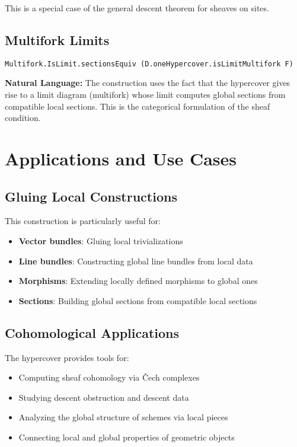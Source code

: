 \documentclass{article}
\theoremstyle{definition}
\begin{document}
This is a special case of the general descent theorem for sheaves on sites.

\subsection{Multifork Limits}

\begin{lstlisting}
Multifork.IsLimit.sectionsEquiv (D.oneHypercover.isLimitMultifork F)
\end{lstlisting}

\textbf{Natural Language:} The construction uses the fact that the hypercover gives rise to a limit diagram (multifork) whose limit computes global sections from compatible local sections. This is the categorical formulation of the sheaf condition.

\section{Applications and Use Cases}

\subsection{Gluing Local Constructions}

This construction is particularly useful for:
\begin{itemize}
\item \textbf{Vector bundles}: Gluing local trivializations
\item \textbf{Line bundles}: Constructing global line bundles from local data
\item \textbf{Morphisms}: Extending locally defined morphisms to global ones
\item \textbf{Sections}: Building global sections from compatible local sections
\end{itemize}

\subsection{Cohomological Applications}

The hypercover provides tools for:
\begin{itemize}
\item Computing sheaf cohomology via Čech complexes
\item Studying descent obstruction and descent data
\item Analyzing the global structure of schemes via local pieces
\item Connecting local and global properties of geometric objects
\end{itemize}
\end{document}
